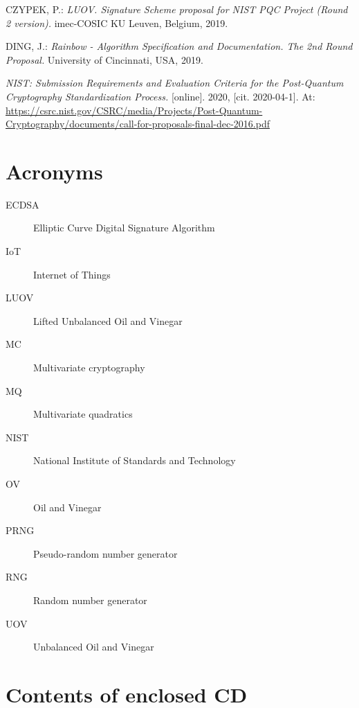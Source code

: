 \documentclass[thesis=M,english]{FITthesis}[2019/12/23]
\begin{document}
\begin{thebibliography}{9}
CZYPEK, P.: \textit{LUOV. Signature Scheme proposal for NIST PQC Project (Round 2 version).} imec-COSIC KU Leuven, Belgium, 2019.

DING, J.: \textit{Rainbow - Algorithm Specification and Documentation. The 2nd Round Proposal.} University of Cincinnati, USA, 2019.

\textit{NIST: Submission Requirements and Evaluation Criteria for the Post-Quantum Cryptography Standardization Process.} [online]. 2020, [cit. 2020-04-1]. At: \url{https://csrc.nist.gov/CSRC/media/Projects/Post-Quantum-Cryptography/documents/call-for-proposals-final-dec-2016.pdf}

\end{thebibliography}
\appendix

\chapter{Acronyms}
\begin{description}
	\item[ECDSA] Elliptic Curve Digital Signature Algorithm
	\item[IoT] Internet of Things
	\item[LUOV] Lifted Unbalanced Oil and Vinegar
	\item[MC] Multivariate cryptography
	\item[MQ] Multivariate quadratics
	\item[NIST] National Institute of Standards and Technology
	\item[OV] Oil and Vinegar
	\item[PRNG] Pseudo-random number generator
	\item[RNG] Random number generator
	\item[UOV] Unbalanced Oil and Vinegar	
\end{description}


\chapter{Contents of enclosed CD}


\begin{figure}
\end{figure}
\end{document}
